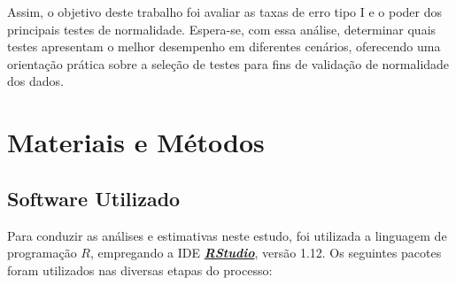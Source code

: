 \documentclass[a4paper,11pt]{article} %
\begin{document}
Assim, o objetivo deste trabalho foi avaliar as taxas de erro tipo I e o poder dos principais testes de normalidade. Espera-se, com essa análise, determinar quais testes apresentam o melhor desempenho em diferentes cenários, oferecendo uma orientação prática sobre a seleção de testes para fins de validação de normalidade dos dados.

\section{Materiais e Métodos} %
\subsection{Software Utilizado} %

Para conduzir as análises e estimativas neste estudo, foi utilizada a linguagem de programação $R$, empregando a IDE \href{https://posit.co/download/rstudio-desktop/}{\textit{\textbf{RStudio}}}, versão 1.12. Os seguintes pacotes foram utilizados nas diversas etapas do processo:
\end{document}
